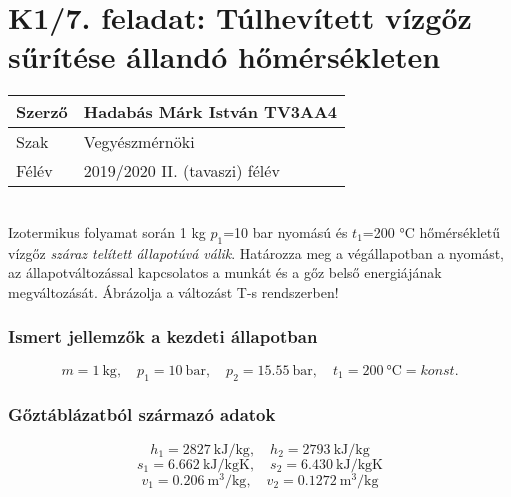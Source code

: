 	\section*{K1/7. feladat: Túlhevített vízgőz sűrítése állandó hőmérsékleten}
		\begin{tabular}{ | p{2cm} | p{14cm} | } 
			\hline
			Szerző & Hadabás Márk István TV3AA4 \\ 
			\hline
			Szak & Vegyészmérnöki \\ 
			\hline
			Félév & 2019/2020 II. (tavaszi) félév \\ 
			\hline
		\end{tabular}
			\vspace{0.5cm} 		
			\\
		Izotermikus folyamat során 1 kg $p_1$=10 bar nyomású és $t_1$=200 °C hőmérsékletű vízgőz \textit{száraz telített állapotúvá válik}. Határozza meg a végállapotban a nyomást, az állapotváltozással kapcsolatos a munkát és a  gőz belső energiájának megváltozását. Ábrázolja a változást T-s rendszerben! \\
		\subsubsection{Ismert jellemzők a kezdeti állapotban} 
			\begin{equation*}
				m= \SI{1}{\kilogram}, 
				\quad
				p_1= \SI{10}{\bar},
				\quad
				p_2= \SI{15,55}{\bar},
				\quad
				t_1=\SI{200}{\celsius} = konst.
			\end{equation*}
		\subsubsection{Gőztáblázatból származó adatok}
			\begin{equation*}
				h_1 = \SI{2827}{\kilo\joule\per\kilogram}, 
				\quad
				h_2= \SI{2793}{\kilo\joule\per\kilogram}
			\end{equation*}
			\begin{equation*}
				s_1 = \SI{6,662}{\kilo\joule\per\kilogram\kelvin},
				\quad
				s_2 = \SI{6,430}{\kilo\joule\per\kilogram\kelvin}
			\end{equation*}
			\begin{equation*}
				v_1 = \SI{0,206}{\meter\cubed\per\kilogram},
				\quad
				v_2 = \SI{0,1272}{\meter\cubed\per\kilogram}
			\end{equation*}
			\noindent\hrulefill

